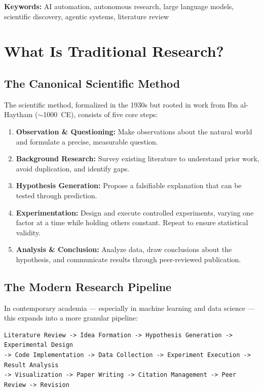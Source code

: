 \documentclass[11pt,a4paper]{article}
\begin{document}
\vspace{1em}
\noindent\textbf{Keywords:} AI automation, autonomous research, large language models, scientific discovery, agentic systems, literature review

\vspace{1.5em}

\section{What Is Traditional Research?}

\subsection{The Canonical Scientific Method}

The scientific method, formalized in the 1930s but rooted in work from Ibn al-Haytham ($\sim$1000~CE), consists of five core steps:

\begin{enumerate}[leftmargin=2em]
    \item \textbf{Observation \& Questioning:} Make observations about the natural world and formulate a precise, measurable question.
    \item \textbf{Background Research:} Survey existing literature to understand prior work, avoid duplication, and identify gaps.
    \item \textbf{Hypothesis Generation:} Propose a falsifiable explanation that can be tested through prediction.
    \item \textbf{Experimentation:} Design and execute controlled experiments, varying one factor at a time while holding others constant. Repeat to ensure statistical validity.
    \item \textbf{Analysis \& Conclusion:} Analyze data, draw conclusions about the hypothesis, and communicate results through peer-reviewed publication.
\end{enumerate}

\subsection{The Modern Research Pipeline}

In contemporary academia --- especially in machine learning and data science --- this expands into a more granular pipeline:

\begin{verbatim}
Literature Review -> Idea Formation -> Hypothesis Generation -> Experimental Design
-> Code Implementation -> Data Collection -> Experiment Execution -> Result Analysis
-> Visualization -> Paper Writing -> Citation Management -> Peer Review -> Revision
\end{verbatim}
\end{document}
